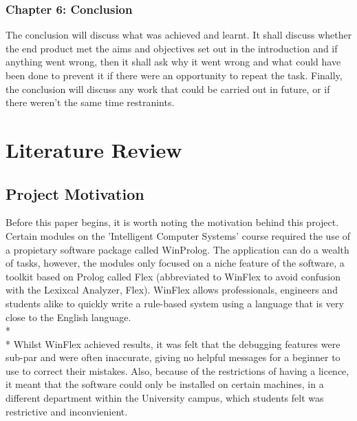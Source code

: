 \documentclass[12pt]{report}
\begin{document}
\subsection{Chapter 6: Conclusion}\label{sec:sub:chapter6}
The conclusion will discuss what was achieved and learnt.  It shall discuss whether the end product met the aims and objectives set out in the introduction and if anything went wrong, then it shall ask why it went wrong and what could have been done to prevent it if there were an opportunity to repeat the task.  Finally, the conclusion will discuss any work that could be carried out in future, or if there weren't the same time restranints.
\chapter{Literature Review}
\section{Project Motivation}\label{sec:project_motivation}
Before this paper begins, it is worth noting the motivation behind this project.  Certain modules on the 'Intelligent Computer Systems' course required the use of a propietary software package called WinProlog.  The application can do a wealth of tasks, however, the modules only focused on a niche feature of the software, a toolkit based on Prolog called Flex (abbreviated to WinFlex to avoid confusion with the Lexixcal Analyzer, Flex).  WinFlex allows professionals, engineers and students alike to quickly write a rule-based system using a language that is very close to the English language.
\\*
\\*
Whilst WinFlex achieved results, it was felt that the debugging features were sub-par and were often inaccurate, giving no helpful messages for a beginner to use to correct their mistakes.  Also, because of the restrictions of having a licence, it meant that the software could only be installed on certain machines, in a different department within the University campus, which students felt was restrictive and inconvienient.
\\
\\
\\
\\
\end{document}
